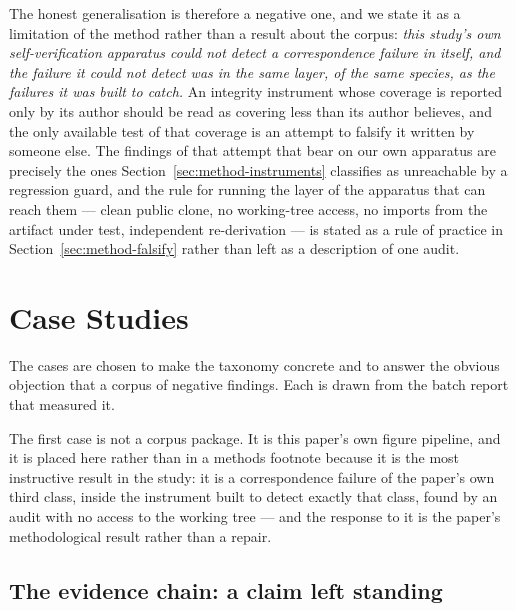 \documentclass[sigconf,review]{acmart}
\begin{document}
The honest generalisation is therefore a negative one, and we state it as a
limitation of the method rather than a result about the corpus: \emph{this
study's own self-verification apparatus could not detect a correspondence
failure in itself, and the failure it could not detect was in the same layer,
of the same species, as the failures it was built to catch.} An integrity
instrument whose coverage is reported only by its author should be read as
covering less than its author believes, and the only available test of that
coverage is an attempt to falsify it written by someone else. The findings of
that attempt that bear on our own apparatus are precisely the ones
Section~\ref{sec:method-instruments} classifies as unreachable by a regression
guard, and the rule for running the layer of the apparatus that can reach them
--- clean public clone, no working-tree access, no imports from the artifact
under test, independent re-derivation --- is stated as a rule of practice in
Section~\ref{sec:method-falsify} rather than left as a description of one
audit.

\section{Case Studies}
\label{sec:cases}

The cases are chosen to make the taxonomy concrete and to answer the obvious
objection that a corpus of negative findings. Each is drawn from the batch
report that measured it.

The first case is not a corpus package. It is this paper's own figure pipeline,
and it is placed here rather than in a methods footnote because it is the most
instructive result in the study: it is a correspondence failure of the paper's
own third class, inside the instrument built to detect exactly that class, found
by an audit with no access to the working tree --- and the response to it is
the paper's methodological result rather than a repair.

\subsection{The evidence chain: a claim left standing}
\label{sec:case-chain}
\end{document}
